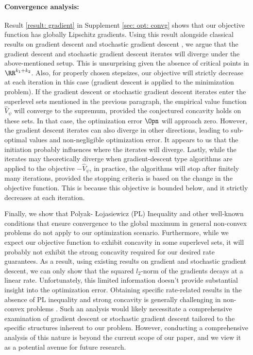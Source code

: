 \documentclass[preprint] {imsart}
\begin{document}
{\paragraph{Convergence analysis:}
Result \ref{result: gradient} in Supplement \ref{sec: opt: convg} shows that our objective function has  globally Lipschitz gradients. Using this result alongside classical results on gradient descent and stochastic gradient descent \citep{bottou2018optimization}, we argue that the gradient descent and stochastic gradient descent iterates  will diverge under the above-mentioned setup. This is unsurprising given the absence of critical points in $\RR^{k_1+k_2}$. Also,  for properly chosen stepsizes, our objective will strictly decrease at each iteration  in this case (gradient descent is applied to the  minimization problem). If the gradient descent or stochastic gradient descent iterates enter the  superlevel sets mentioned in the previous paragraph,   the empirical value function $\widehat V_\psi$ will converge to the supremum, provided the conjectured concavity holds on these sets. In that case, the optimization error $\Opn$ will approach zero. 
However,  the gradient descent iterates can also diverge in other directions, leading to sub-optimal values and non-negligible optimization error. It appears to us that the initiation probably influences where the iterates will diverge. Lastly, while the iterates may theoretically diverge when gradient-descent type algorithms are applied to the objective $-\widehat V_\psi$,  in practice, the algorithms will stop after finitely many iterations, provided the stopping criteria is based on the change in the objective function. This is because this objective is bounded below, and it strictly decreases at each iteration. 

 Finally, we show that  Polyak- \L{}ojasiewicz (PL) Inequality and other well-known conditions that ensure convergence to the global maximum in general non-convex problems do not apply to our optimization scenario. Furthermore, while we expect our objective function to exhibit concavity in some superlevel sets, it will probably not exhibit the strong concavity required for our desired rate guarantees. As a result,  using  existing results on gradient and stochastic gradient descent, we can only show that the squared $l_2$-norm of the gradients decays at a linear rate. Unfortunately, this limited information doesn't provide substantial insight into the optimization error. Obtaining specific rate-related results in the absence of PL inequality and strong concavity is generally challenging in non-convex problems \citep{patel2022gradient,bottou2018optimization,Patel2021GlobalCA,karimi2016linear}. Such an analysis would likely necessitate a comprehensive examination of gradient descent or stochastic gradient descent tailored to the specific structures inherent to our problem. 
 However, conducting a comprehensive analysis of this nature is beyond the current scope of our paper, and we view it as a potential avenue for future research.}
\end{document}
